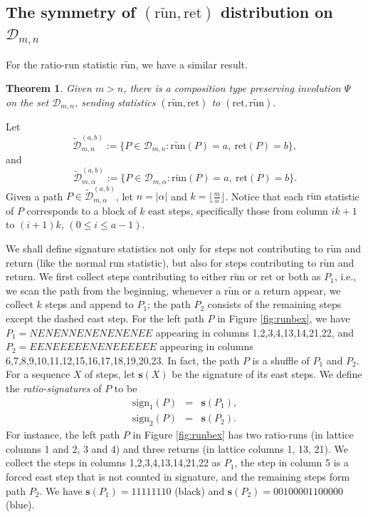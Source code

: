 \documentclass[11pt,a4paper,reqno]{article}
\newtheorem{thm}{Theorem}[section]
\newcommand{\fref}[1]{Figure \ref{fig:#1}}
\newcommand{\DD}{\mathcal{D}}
\newcommand{\runb}{\widetilde{{\mathrm{run}}}}
\newcommand{\signa}{\mathrm{sign}_1}
\newcommand{\signb}{\mathrm{sign}_2}
\newcommand{\tDD}{\widetilde{\mathcal{D}}}
\newcommand{\ret}{\mathrm{ret}}
\newcommand{\al}{\alpha}
\newcommand{\sig}{\mathbf{s}}
\begin{document}
{    
	\subsection{\texorpdfstring{The symmetry of $(\runb,\ret)$ distribution on $\DD_{m,n}$}{The symmetry of (run,ret) distribution on Dmn}}
	For the ratio-run statistic $\runb$, we have a similar result.
	\begin{thm}\label{theorem:runb1}
		Given $m>n$, there is a composition type preserving involution $\Psi$ on the set $\DD_{m,n}$, sending statistics $(\runb, \ret)$ to $(\ret, \runb)$.
	\end{thm}
	
	Let 
	$$\tDD_{m,n}^{(a,b)}:=\{P\in \DD_{m,n}:\runb(P)=a,\ \ret(P)=b\},$$
	and
	$$\tDD_{m,\al}^{(a,b)}:=\{P\in \DD_{m,\al}: \runb(P)=a,\ \ret(P)=b\}.$$
	  Given a path $P\in\tDD_{m,\al}^{(a,b)}$, let $n=|\al|$ and $k = \lfloor \frac{m}{n} \rfloor$. Notice that each $\runb$ statistic of $P$ corresponds 
to a block of $k$ east steps, specifically those from column $ik+1$ to $(i+1)k$, $(0\leq i\leq a-1)$.
    
    We shall define signature statistics not only for steps not contributing to $\runb$ and return (like the normal run statistic), but also for steps contributing to $\runb$ and return. 
    We first collect steps contributing to either {$\runb$} or $\ret$ or both as $P_1$, i.e., we scan the path from the beginning, whenever a {$\runb$} or a return appear, we collect $k$ steps and append to $P_1$; the path $P_2$ consists of the remaining steps except the dashed east step. For the left path $P$ in \fref{runbex}, we have $P_1=NENENNENENENENEE$ appearing in columns 1,2,3,4,13,14,21,22, and $P_2=EENEEEEENENEEEEEE$ appearing in columns 6,7,8,9,10,11,12,15,16,17,18,19,20,23. In fact, the path $P$ is a shuffle of $P_1$ and $P_2$. {For a sequence $X$ of steps, let $\sig(X)$ be the signature of its east steps.} 
	We define the \textit{ratio-signatures} of $P$ to be
	\begin{eqnarray*}
		\signa(P) &=& \sig(P_1),\\
		\signb(P) &=& \sig(P_2).
	\end{eqnarray*} 
	{For instance, the left path $P$ in \fref{runbex} has two ratio-runs (in lattice columns 1 and 2, 3 and 4) and three returns (in lattice columns 1, 13, 21).
    We collect the steps in columns 1,2,3,4,13,14,21,22 as $P_1$, the step in column 5 is a forced east step that is not counted in signature, and the remaining steps form path $P_2$.
    We have $\sig(P_1)=11111110$ (black) and $\sig(P_2)=00100001100000$ (blue)}. 

}
\end{document}
